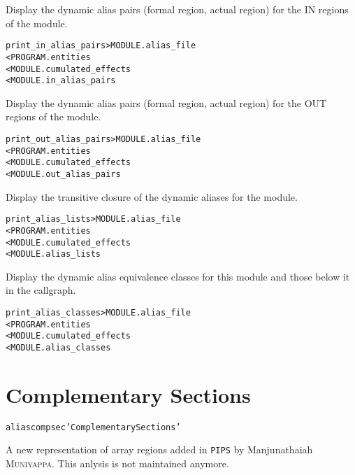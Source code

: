 \documentclass[a4paper]{report}
\newenvironment{PipsMake}{\begin{alltt}}{\end{alltt}}
\newenvironment{PipsPass}[1]{\label{pass:#1}}{}
\newcommand{\Pips}{\texttt{PIPS}}
\begin{document}
\begin{PipsPass}{print_in_alias_pairs}
Display the dynamic alias pairs (formal region, actual region) for the IN
regions of the module.
\end{PipsPass}
\begin{PipsMake}
print_in_alias_pairs > MODULE.alias_file
        < PROGRAM.entities
        < MODULE.cumulated_effects
        < MODULE.in_alias_pairs
\end{PipsMake}

\begin{PipsPass}{print_out_alias_pairs}
Display the dynamic alias pairs (formal region, actual region) for the OUT
regions of the module.
\end{PipsPass}
\begin{PipsMake}
print_out_alias_pairs > MODULE.alias_file
        < PROGRAM.entities
        < MODULE.cumulated_effects
        < MODULE.out_alias_pairs
\end{PipsMake}

\begin{PipsPass}{print_alias_lists}
Display the transitive closure of the dynamic aliases for the module.
\end{PipsPass}
\begin{PipsMake}
print_alias_lists > MODULE.alias_file
        < PROGRAM.entities
        < MODULE.cumulated_effects
        < MODULE.alias_lists
\end{PipsMake}

\begin{PipsPass}{print_alias_classes}
Display the dynamic alias equivalence classes for this module and those
below it in the callgraph.
\end{PipsPass}
\begin{PipsMake}
print_alias_classes > MODULE.alias_file
        < PROGRAM.entities
        < MODULE.cumulated_effects
        < MODULE.alias_classes
\end{PipsMake}


\section{Complementary Sections}
\label{subsection-complementary-sections}

\begin{PipsMake}
alias compsec 'Complementary Sections'
\end{PipsMake}

A new representation of array regions added in \Pips{} by
Manjunathaiah \textsc{Muniyappa}. This anlysis is not maintained
anymore.
\end{document}
